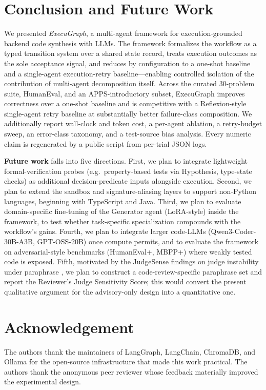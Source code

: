 \documentclass[journal]{IEEEtran}
\begin{document}
\section{Conclusion and Future Work}\label{sec:conclusion}

We presented \emph{ExecuGraph}, a multi-agent framework for execution-grounded backend code synthesis with LLMs. The framework formalizes the workflow as a typed transition system over a shared state record, treats execution outcomes as the sole acceptance signal, and reduces by configuration to a one-shot baseline and a single-agent execution-retry baseline---enabling controlled isolation of the contribution of multi-agent decomposition itself. Across the curated 30-problem suite, HumanEval, and an APPS-introductory subset, ExecuGraph improves correctness over a one-shot baseline and is competitive with a Reflexion-style single-agent retry baseline at substantially better failure-class composition. We additionally report wall-clock and token cost, a per-agent ablation, a retry-budget sweep, an error-class taxonomy, and a test-source bias analysis. Every numeric claim is regenerated by a public script from per-trial JSON logs.

\textbf{Future work} falls into five directions. First, we plan to integrate lightweight formal-verification probes (e.g.\ property-based tests via Hypothesis, type-state checks) as additional decision-predicate inputs alongside execution. Second, we plan to extend the sandbox and signature-aliasing layers to support non-Python languages, beginning with TypeScript and Java. Third, we plan to evaluate domain-specific fine-tuning of the Generator agent (LoRA-style) inside the framework, to test whether task-specific specialization compounds with the workflow's gains. Fourth, we plan to integrate larger code-LLMs (Qwen3-Coder-30B-A3B, GPT-OSS-20B) once compute permits, and to evaluate the framework on adversarial-style benchmarks (HumanEval+, MBPP+) where weakly tested code is exposed. Fifth, motivated by the JudgeSense findings on judge instability under paraphrase \cite{judgesense2026}, we plan to construct a code-review-specific paraphrase set and report the Reviewer's Judge Sensitivity Score; this would convert the present qualitative argument for the advisory-only design into a quantitative one.

\section*{Acknowledgement}
The authors thank the maintainers of LangGraph, LangChain, ChromaDB, and Ollama for the open-source infrastructure that made this work practical. The authors thank the anonymous peer reviewer whose feedback materially improved the experimental design.
\end{document}
